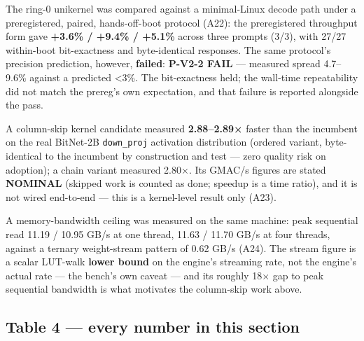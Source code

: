 \documentclass[11pt]{article}
\begin{document}
The ring-0 unikernel was compared against a minimal-Linux decode path under
a preregistered, paired, hands-off-boot protocol (A22): the preregistered
throughput form gave \textbf{+3.6\% / +9.4\% / +5.1\%} across three prompts (3/3),
with 27/27 within-boot bit-exactness and byte-identical responses. The same
protocol's precision prediction, however, \textbf{failed}: \textbf{P-V2-2 FAIL} ---
measured spread 4.7--9.6\% against a predicted \textless3\%. The bit-exactness held;
the wall-time repeatability did not match the prereg's own expectation, and
that failure is reported alongside the pass.

A column-skip kernel candidate measured \textbf{2.88--2.89×} faster than the
incumbent on the real BitNet-2B \texttt{down\_proj} activation distribution (ordered
variant, byte-identical to the incumbent by construction and test --- zero
quality risk on adoption); a chain variant measured 2.80×. Its GMAC/s figures
are stated \textbf{NOMINAL} (skipped work is counted as done; speedup is a time
ratio), and it is not wired end-to-end --- this is a kernel-level result only
(A23).

A memory-bandwidth ceiling was measured on the same machine: peak sequential
read 11.19 / 10.95 GB/s at one thread, 11.63 / 11.70 GB/s at four threads,
against a ternary weight-stream pattern of 0.62 GB/s (A24). The stream
figure is a scalar LUT-walk \textbf{lower bound} on the engine's streaming rate,
not the engine's actual rate --- the bench's own caveat --- and its roughly 18×
gap to peak sequential bandwidth is what motivates the column-skip work
above.

\subsection{Table 4 --- every number in this section}\label{table-4-every-number-in-this-section}
\end{document}
